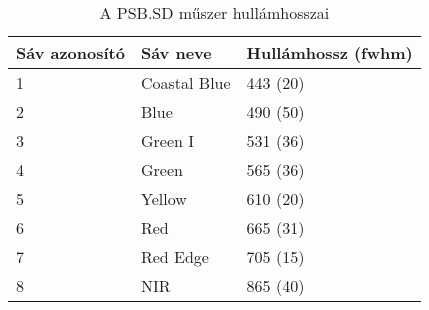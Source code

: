 \begin{table}[H]
	\centering
	\begin{tabular}{ | p{} | p{} | p{} | }
		\hline
		\textbf{Sáv azonosító} & \textbf{Sáv neve} & \textbf{Hullámhossz (fwhm)} \\
		\hline \hline
		1 & Coastal Blue & 443 (20) \\
		\hline
		2 & Blue & 490 (50) \\
		\hline
		3 & Green I & 531 (36) \\
		\hline
        4 & Green & 565 (36) \\
		\hline
		5 & Yellow & 610 (20) \\
		\hline
		6 & Red & 665 (31) \\
		\hline
		7 & Red Edge & 705 (15) \\
		\hline
        8 & NIR & 865 (40) \\
		\hline
	\end{tabular}
	\caption{A PSB.SD műszer hullámhosszai \cite{planetsensors2024}}
	\label{tab:planet-wavelengths}
\end{table}

